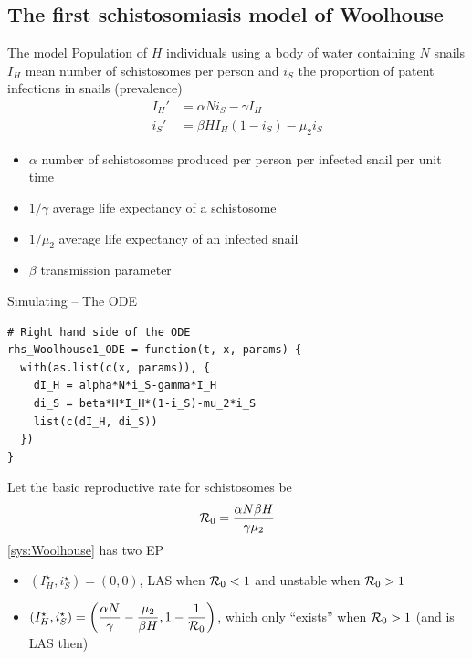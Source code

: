 \documentclass[aspectratio=169]{beamer}
\begin{document}
\subsection{The first schistosomiasis model of Woolhouse}
\begin{frame}{The model}
  Population of $H$ individuals using a body of water containing $N$ snails
  \vfill
  $I_H$ mean number of schistosomes per person and $i_S$ the proportion of patent infections in snails 
  (prevalence)
  \vfill
  \begin{subequations}
    \label{sys:Woolhouse}
    \begin{align}
      I_H' &= \alpha Ni_S-\gamma I_H \\
      i_S' &= \beta HI_H(1-i_S)-\mu_2 i_S
    \end{align}
  \end{subequations}
  \begin{itemize}
    \item $\alpha$ number of schistosomes produced per person per infected snail per unit time
    \item $1/\gamma$ average life expectancy of a schistosome
    \item $1/\mu_2$ average life expectancy of an infected snail
    \item $\beta$ transmission parameter
  \end{itemize}
\end{frame}


\begin{frame}[fragile]{Simulating -- The ODE}
\begin{lstlisting}
# Right hand side of the ODE
rhs_Woolhouse1_ODE = function(t, x, params) {
  with(as.list(c(x, params)), {
    dI_H = alpha*N*i_S-gamma*I_H
    di_S = beta*H*I_H*(1-i_S)-mu_2*i_S
    list(c(dI_H, di_S))
  })
}  
\end{lstlisting}
\end{frame}

\begin{frame}
  Let the basic reproductive rate for schistosomes be
  \begin{equation}
    \label{eq:R0_Woolhouse}
    \mathcal{R}_0 = \frac{\alpha N\beta H}{\gamma\mu_2}
  \end{equation}
  \vfill
  \eqref{sys:Woolhouse} has two EP
  \begin{itemize}
    \item $(I_H^\star,i_S^\star)=(0,0)$, LAS when $\mathcal{R}_0<1$ and unstable when $\mathcal{R}_0>1$
    \item $(I_H^\star,i_S^\star)=\left(\dfrac{\alpha N}{\gamma}-\dfrac{\mu_2}{\beta H},1-\dfrac{1}{\mathcal{R}_0}\right)$, which only ``exists'' when $\mathcal{R}_0>1$ (and is LAS then)
  \end{itemize}
\end{frame}
\end{document}

